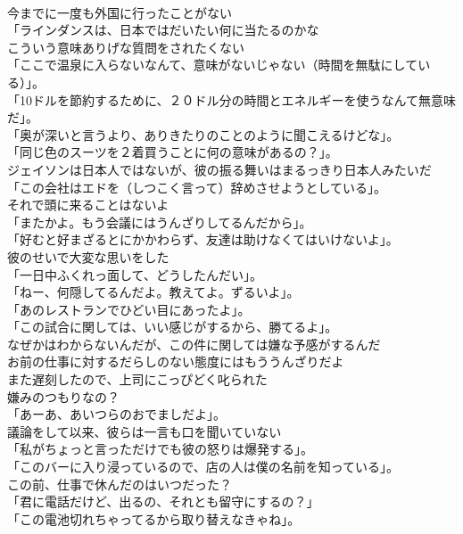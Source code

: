 \documentclass[8pt]{extreport}
\begin{document}
\begin{CJK}{UTF8}{min}
\\	今までに一度も外国に行ったことがない	
\\	「ラインダンスは、日本ではだいたい何に当たるのかな	
\\	こういう意味ありげな質問をされたくない	
\\	「ここで温泉に入らないなんて、意味がないじゃない（時間を無駄にしている）」。	
\\	「10ドルを節約するために、２０ドル分の時間とエネルギーを使うなんて無意味だ」。	
\\	「奥が深いと言うより、ありきたりのことのように聞こえるけどな」。	
\\	「同じ色のスーツを２着買うことに何の意味があるの？」。	
\\	ジェイソンは日本人ではないが、彼の振る舞いはまるっきり日本人みたいだ	
\\	「この会社はエドを（しつこく言って）辞めさせようとしている」。	
\\	それで頭に来ることはないよ	
\\	「またかよ。もう会議にはうんざりしてるんだから」。	
\\	「好むと好まざるとにかかわらず、友達は助けなくてはいけないよ」。	
\\	彼のせいで大変な思いをした	
\\	「一日中ふくれっ面して、どうしたんだい」。	
\\	「ねー、何隠してるんだよ。教えてよ。ずるいよ」。	
\\	「あのレストランでひどい目にあったよ」。	
\\	「この試合に関しては、いい感じがするから、勝てるよ」。	
\\	なぜかはわからないんだが、この件に関しては嫌な予感がするんだ	
\\	お前の仕事に対するだらしのない態度にはもううんざりだよ	
\\	また遅刻したので、上司にこっぴどく叱られた	
\\	嫌みのつもりなの？	
\\	「あーあ、あいつらのおでましだよ」。	
\\	議論をして以来、彼らは一言も口を聞いていない	
\\	「私がちょっと言っただけでも彼の怒りは爆発する」。	
\\	「このバーに入り浸っているので、店の人は僕の名前を知っている」。	
\\	この前、仕事で休んだのはいつだった？	
\\	「君に電話だけど、出るの、それとも留守にするの？」	
\\	「この電池切れちゃってるから取り替えなきゃね」。	

\end{CJK}
\end{document}
